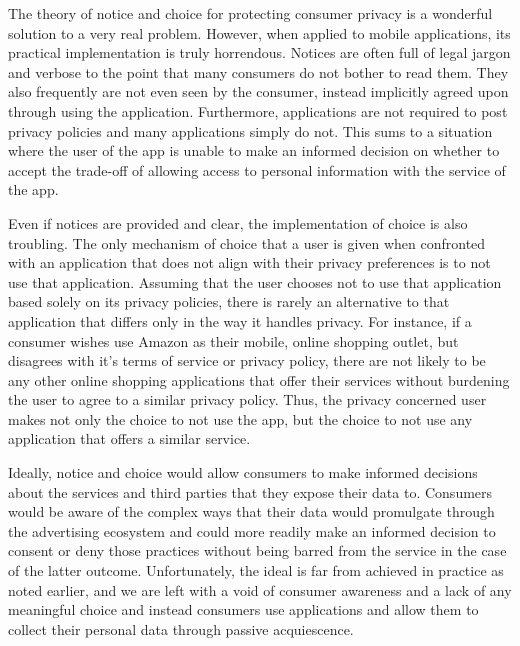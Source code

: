 The theory of notice and choice for protecting consumer privacy is a wonderful solution to a very real problem. However, when applied to mobile applications, its practical implementation is truly horrendous. Notices are often full of legal jargon and verbose to the point that many consumers do not bother to read them\cite{ftcworkshop}. They also frequently are not even seen by the consumer, instead implicitly agreed upon through using the application. Furthermore, applications are not required to post privacy policies and many applications simply do not\cite{Thru2010}. This sums to a situation where the user of the app is unable to make an informed decision on whether to accept the trade-off of allowing access to personal information with the service of the app.

Even if notices are provided and clear, the implementation of choice is also troubling. The only mechanism of choice that a user is given 
when confronted with an application that does not align with their privacy preferences
is to not use that application. Assuming that the user chooses not to use that application based solely on its privacy policies, there is rarely an alternative to that application that differs only in the way it handles privacy. For instance, if a consumer wishes use Amazon as their mobile, online shopping outlet, but disagrees with it's terms of service or privacy policy, there are not likely to be any other online shopping applications that offer their services without burdening the user to agree to a similar privacy policy\cite{policies}. Thus, the privacy concerned user makes not only the choice to not use the app, but the choice to not use any application that offers a similar service.



Ideally, notice and choice would allow consumers to make informed decisions about the services and third parties that they expose their data to. Consumers would be aware of the complex ways that their data would promulgate through the advertising ecosystem and could more readily make an informed decision to consent or deny those practices without being barred from the service in the case of the latter outcome. Unfortunately, the ideal is far from achieved in practice as noted earlier, and we are left with a void of consumer awareness and a lack of any meaningful choice and instead consumers use applications and allow them to collect their personal data through passive acquiescence\cite{sloan}. 


